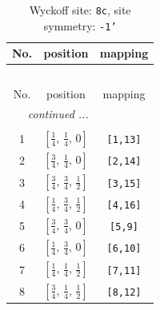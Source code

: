\documentclass[fleqn,8pt]{jsarticle}
\begin{document}
\renewcommand{\arraystretch}{1.2}
\begin{longtable}{ccc}
\caption{Wyckoff site: {\tt 8c}, site symmetry: {\tt -1'}}
 \\
 \hline \hline
No. & position & mapping \\ \hline \endfirsthead

\multicolumn{2}{l}{\tablename\ \thetable{}} \\
 \hline \hline
No. & position & mapping \\ \hline \endhead

 \hline \hline
\multicolumn{2}{r}{\footnotesize\it continued ...} \\ \endfoot

 \hline \hline
\multicolumn{2}{r}{} \\ \endlastfoot

1 & $\left[ \frac{1}{4},\, \frac{1}{4},\, 0 \right]$ & {\tt [1,13]} \\ \hline
2 & $\left[ \frac{3}{4},\, \frac{1}{4},\, 0 \right]$ & {\tt [2,14]} \\ \hline
3 & $\left[ \frac{3}{4},\, \frac{3}{4},\, \frac{1}{2} \right]$ & {\tt [3,15]} \\ \hline
4 & $\left[ \frac{1}{4},\, \frac{3}{4},\, \frac{1}{2} \right]$ & {\tt [4,16]} \\ \hline
5 & $\left[ \frac{3}{4},\, \frac{3}{4},\, 0 \right]$ & {\tt [5,9]} \\ \hline
6 & $\left[ \frac{1}{4},\, \frac{3}{4},\, 0 \right]$ & {\tt [6,10]} \\ \hline
7 & $\left[ \frac{1}{4},\, \frac{1}{4},\, \frac{1}{2} \right]$ & {\tt [7,11]} \\ \hline
8 & $\left[ \frac{3}{4},\, \frac{1}{4},\, \frac{1}{2} \right]$ & {\tt [8,12]} \\
\end{longtable}
\renewcommand{\arraystretch}{1.2}
\end{document}
